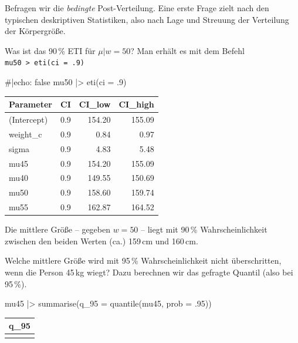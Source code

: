 \documentclass[
  ngerman,
  letterpaper,
  twoside,
  open=any]{scrbook}
\newenvironment{Shaded}{\begin{snugshade}}{\end{snugshade}}
\newcommand{\AttributeTok}[1]{\textcolor[rgb]{0.40,0.45,0.13}{#1}}
\newcommand{\CommentTok}[1]{\textcolor[rgb]{0.37,0.37,0.37}{#1}}
\newcommand{\DecValTok}[1]{\textcolor[rgb]{0.68,0.00,0.00}{#1}}
\newcommand{\FunctionTok}[1]{\textcolor[rgb]{0.28,0.35,0.67}{#1}}
\newcommand{\NormalTok}[1]{\textcolor[rgb]{0.00,0.23,0.31}{#1}}
\newcommand{\SpecialCharTok}[1]{\textcolor[rgb]{0.37,0.37,0.37}{#1}}
\newcounter{none} %
\theoremstyle{definition}
\theoremstyle{plain}
\theoremstyle{definition}
\theoremstyle{definition}
\theoremstyle{definition}
\theoremstyle{definition}
\theoremstyle{remark}
\begin{document}
Befragen wir die \emph{bedingte} Post-Verteilung. Eine erste Frage zielt
nach den typischen deskriptiven Statistiken, also nach Lage und Streuung
der Verteilung der Körpergröße.

Was ist das 90\,\% ETI für \(\mu|w=50\)? Man erhält es mit dem Befehl
\texttt{mu50\ \textbar{}\textgreater{}\ eti(ci\ =\ .9)}

\begin{Shaded}
\begin{Highlighting}[]
\CommentTok{\#|echo: false}
\NormalTok{mu50 }\SpecialCharTok{|\textgreater{}}
  \FunctionTok{eti}\NormalTok{(}\AttributeTok{ci =}\NormalTok{ .}\DecValTok{9}\NormalTok{)}
\end{Highlighting}
\end{Shaded}

{\def\LTcaptype{none} %
\begin{longtable}[]{@{}lrrr@{}}
\toprule\noalign{}
Parameter & CI & CI\_low & CI\_high \\
\midrule\noalign{}
\endhead
\bottomrule\noalign{}
\endlastfoot
(Intercept) & 0.9 & 154.20 & 155.09 \\
weight\_c & 0.9 & 0.84 & 0.97 \\
sigma & 0.9 & 4.83 & 5.48 \\
mu45 & 0.9 & 154.20 & 155.09 \\
mu40 & 0.9 & 149.55 & 150.69 \\
mu50 & 0.9 & 158.60 & 159.74 \\
mu55 & 0.9 & 162.87 & 164.52 \\
\end{longtable}
}

Die mittlere Größe -- gegeben \(w=50\) -- liegt mit 90\,\%
Wahrscheinlichkeit zwischen den beiden Werten (ca.) 159\,cm und 160\,cm.

Welche mittlere Größe wird mit 95\,\% Wahrscheinlichkeit nicht
überschritten, wenn die Person 45\,kg wiegt? Dazu berechnen wir das
gefragte Quantil (also bei 95\,\%).

\begin{Shaded}
\begin{Highlighting}[]
\NormalTok{mu45 }\SpecialCharTok{|\textgreater{}}
  \FunctionTok{summarise}\NormalTok{(}\AttributeTok{q\_95 =} \FunctionTok{quantile}\NormalTok{(mu45, }\AttributeTok{prob =}\NormalTok{ .}\DecValTok{95}\NormalTok{))}
\end{Highlighting}
\end{Shaded}

{\def\LTcaptype{none} %
\begin{longtable}[]{@{}r@{}}
\toprule\noalign{}
q\_95 \\
\midrule\noalign{}
\endhead
\bottomrule\noalign{}
\endlastfoot
155 \\
\end{longtable}
}
\end{document}
